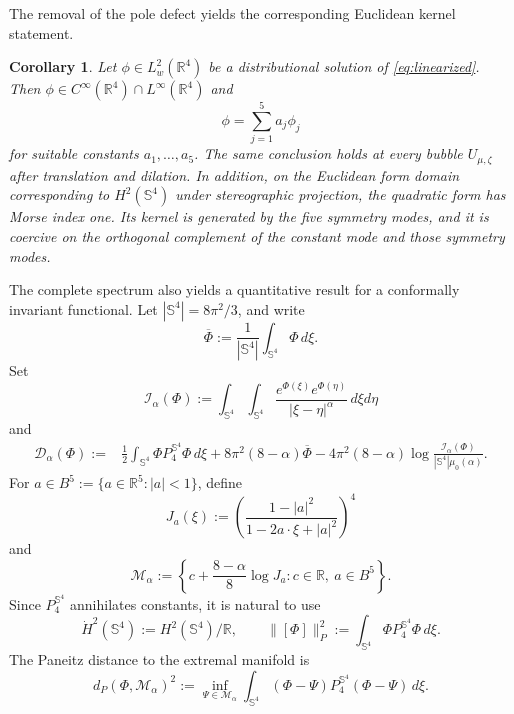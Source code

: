 \documentclass[11pt]{article}
\newtheorem{corollary}[theorem]{Corollary}
\numberwithin{equation}{section}
\begin{document}
The removal of the pole defect yields the corresponding Euclidean kernel statement.

\begin{corollary}\label{cor:euclidean-nondegeneracy}
Let \(\phi\in L^{2}_{w}(\mathbb R^{4})\) be a distributional solution of \eqref{eq:linearized}. Then \(\phi\in C^{\infty}(\mathbb R^{4})\cap L^{\infty}(\mathbb R^{4})\) and
\[
\phi=\sum_{j=1}^{5}a_{j}\phi_{j}
\]
for suitable constants \(a_{1},\ldots,a_{5}\). The same conclusion holds at
every bubble \(U_{\mu,\zeta}\) after translation and dilation. In addition, on
the Euclidean form domain corresponding to \(H^{2}(\mathbb S^{4})\) under
stereographic projection, the quadratic form has Morse index one. Its kernel
is generated by the five symmetry modes, and it is coercive on the orthogonal
complement of the constant mode and those symmetry modes.
\end{corollary}


The complete spectrum also yields a quantitative result for a conformally invariant functional. Let \(|\mathbb S^{4}|=8\pi^{2}/3\), and write
\[
\overline{\Phi}:=\frac{1}{|\mathbb S^{4}|}
\int_{\mathbb S^{4}}\Phi\,d\xi.
\]
Set
\begin{equation*}
\mathcal I_{\alpha}(\Phi)
:=\int_{\mathbb S^{4}}\int_{\mathbb S^{4}}
\frac{e^{\Phi(\xi)}e^{\Phi(\eta)}}{|\xi-\eta|^{\alpha}}\,d\xi d\eta
\end{equation*}
and
\begin{equation}\label{eq:deficit}
\begin{aligned}
\mathcal D_{\alpha}(\Phi)
:={}&\frac12\int_{\mathbb S^{4}}
\Phi P_{4}^{\mathbb S^{4}}\Phi\,d\xi
+8\pi^{2}(8-\alpha)\overline{\Phi}-4\pi^{2}(8-\alpha)
\log\frac{\mathcal I_{\alpha}(\Phi)}
{|\mathbb S^{4}|\mu_{0}(\alpha)}.
\end{aligned}
\end{equation}
For \(a\in B^{5}:=\{a\in\mathbb R^{5}:|a|<1\}\), define
\begin{equation}\label{eq:J-a}
J_{a}(\xi)
:=\left(\frac{1-|a|^{2}}
{1-2a\cdot\xi+|a|^{2}}\right)^{4}
\end{equation}
and
\begin{equation*}
\mathcal M_{\alpha}
:=\left\{c+\frac{8-\alpha}{8}\log J_{a}:
 c\in\mathbb R,\ a\in B^{5}\right\}.
\end{equation*}
Since \(P_{4}^{\mathbb S^{4}}\) annihilates constants, it is natural to use
\begin{equation*}
\dot H^{2}(\mathbb S^{4}):=H^{2}(\mathbb S^{4})/\mathbb R,
\qquad
\|[\Phi]\|_{P}^{2}:=
\int_{\mathbb S^{4}}\Phi P_{4}^{\mathbb S^{4}}\Phi\,d\xi.
\end{equation*}
The Paneitz distance to the extremal manifold is
\begin{equation*}
d_{P}(\Phi,\mathcal M_{\alpha})^{2}
:=\inf_{\Psi\in\mathcal M_{\alpha}}
\int_{\mathbb S^{4}}(\Phi-\Psi)
P_{4}^{\mathbb S^{4}}(\Phi-\Psi)\,d\xi.
\end{equation*}
\end{document}
